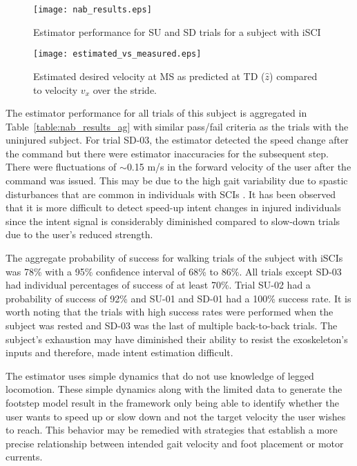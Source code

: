 \begin{figure}
	\centering
	\texttt{[image: nab\_results.eps]}
	\caption{Estimator performance for SU and SD trials for a subject with iSCI} \label{fig:nab_results}
\end{figure}

\begin{figure}
	\centering
	\texttt{[image: estimated\_vs\_measured.eps]}
	\caption{Estimated desired velocity at MS as predicted at TD ($\hat{z}$) compared to velocity $v_x$ over the stride.} \label{fig:m_v_e}
\end{figure}
%

%
The estimator performance for all trials of this subject is aggregated in Table~\ref{table:nab_results_ag} with similar pass/fail criteria as the trials with the uninjured subject. For trial SD-03, the estimator detected the speed change after the command but there were estimator inaccuracies for the subsequent step. There were fluctuations of $ \sim $0.15 m/s in the forward velocity of the user after the command was issued. This may be due to the high gait variability due to spastic disturbances that are common in individuals with SCIs \cite{malhotra2009spasticity}. It has been observed that it is more difficult to detect speed-up intent changes in injured individuals since the intent signal is considerably diminished compared to slow-down trials \cite{gambon2020effects} due to the user's reduced strength.

The aggregate probability of success for walking trials of the subject with iSCIs was 78\% with a 95\% confidence interval of 68\% to 86\%. All trials except SD-03 had individual percentages of success of at least 70\%. Trial SU-02 had a probability of success of 92\% and SU-01 and SD-01 had a 100\% success rate. It is worth noting that the trials with high success rates were performed when the subject was rested and SD-03 was the last of multiple back-to-back trials. The subject's exhaustion may have diminished their ability to resist the exoskeleton's inputs and therefore, made intent estimation difficult.

The estimator uses simple dynamics that do not use knowledge of legged locomotion. These simple dynamics along with the limited data to generate the footstep model result in the framework only being able to identify whether the user wants to speed up or slow down and not the target velocity the user wishes to reach. This behavior may be remedied with strategies that establish a more precise relationship between intended gait velocity and foot placement or motor currents.

